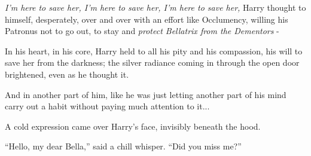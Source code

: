 \emph{I'm here to save her, I'm here to save her, I'm here to save her,}
Harry thought to himself, desperately, over and over with an effort like
Occlumency, willing his Patronus not to go out, to stay and
\emph{protect Bellatrix from the Dementors} -

In his heart, in his core, Harry held to all his pity and his
compassion, his will to save her from the darkness; the silver radiance
coming in through the open door brightened, even as he thought it.

And in another part of him, like he was just letting another part of his
mind carry out a habit without paying much attention to it...

A cold expression came over Harry's face, invisibly beneath the hood.

``Hello, my dear Bella,'' said a chill whisper. ``Did you miss me?''
